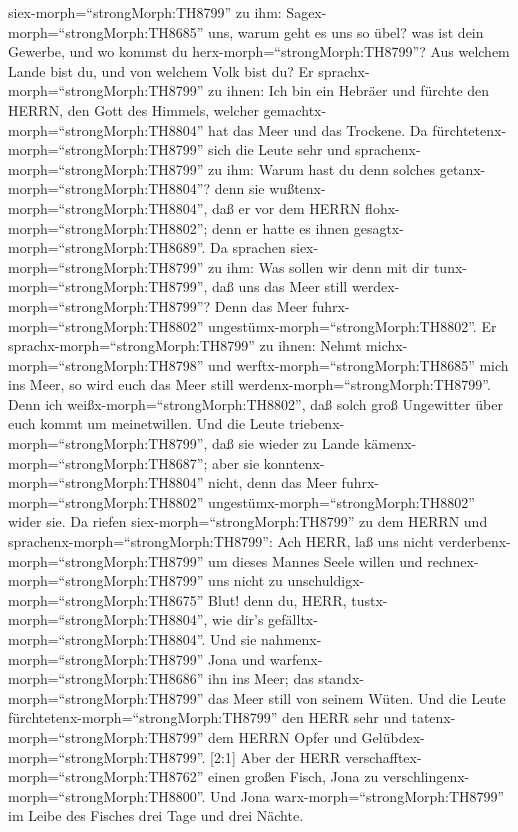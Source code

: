 siex-morph=``strongMorph:TH8799'' zu ihm:
Sagex-morph=``strongMorph:TH8685'' uns, warum geht es uns so übel? was
ist dein Gewerbe, und wo kommst du herx-morph=``strongMorph:TH8799''?
Aus welchem Lande bist du, und von welchem Volk bist du?  Er
sprachx-morph=``strongMorph:TH8799'' zu ihnen: Ich bin ein Hebräer und
fürchte den HERRN, den Gott des Himmels, welcher
gemachtx-morph=``strongMorph:TH8804'' hat das Meer und das Trockene.
 Da fürchtetenx-morph=``strongMorph:TH8799'' sich die Leute
sehr und sprachenx-morph=``strongMorph:TH8799'' zu ihm: Warum hast du
denn solches getanx-morph=``strongMorph:TH8804''? denn sie
wußtenx-morph=``strongMorph:TH8804'', daß er vor dem HERRN
flohx-morph=``strongMorph:TH8802''; denn er hatte es ihnen
gesagtx-morph=``strongMorph:TH8689''.  Da sprachen
siex-morph=``strongMorph:TH8799'' zu ihm: Was sollen wir denn mit dir
tunx-morph=``strongMorph:TH8799'', daß uns das Meer still
werdex-morph=``strongMorph:TH8799''? Denn das Meer
fuhrx-morph=``strongMorph:TH8802''
ungestümx-morph=``strongMorph:TH8802''.  Er
sprachx-morph=``strongMorph:TH8799'' zu ihnen: Nehmt
michx-morph=``strongMorph:TH8798'' und
werftx-morph=``strongMorph:TH8685'' mich ins Meer, so wird euch das Meer
still werdenx-morph=``strongMorph:TH8799''. Denn ich
weißx-morph=``strongMorph:TH8802'', daß solch groß Ungewitter über euch
kommt um meinetwillen.  Und die Leute
triebenx-morph=``strongMorph:TH8799'', daß sie wieder zu Lande
kämenx-morph=``strongMorph:TH8687''; aber sie
konntenx-morph=``strongMorph:TH8804'' nicht, denn das Meer
fuhrx-morph=``strongMorph:TH8802''
ungestümx-morph=``strongMorph:TH8802'' wider sie.  Da
riefen siex-morph=``strongMorph:TH8799'' zu dem HERRN und
sprachenx-morph=``strongMorph:TH8799'': Ach HERR, laß uns nicht
verderbenx-morph=``strongMorph:TH8799'' um dieses Mannes Seele willen
und rechnex-morph=``strongMorph:TH8799'' uns nicht zu
unschuldigx-morph=``strongMorph:TH8675'' Blut! denn du, HERR,
tustx-morph=``strongMorph:TH8804'', wie dir's
gefälltx-morph=``strongMorph:TH8804''.  Und sie
nahmenx-morph=``strongMorph:TH8799'' Jona und
warfenx-morph=``strongMorph:TH8686'' ihn ins Meer; das
standx-morph=``strongMorph:TH8799'' das Meer still von seinem Wüten.
 Und die Leute fürchtetenx-morph=``strongMorph:TH8799'' den
HERR sehr und tatenx-morph=``strongMorph:TH8799'' dem HERRN Opfer und
Gelübdex-morph=``strongMorph:TH8799''.  {[}2:1{]} Aber der
HERR verschafftex-morph=``strongMorph:TH8762'' einen großen Fisch, Jona
zu verschlingenx-morph=``strongMorph:TH8800''. Und Jona
warx-morph=``strongMorph:TH8799'' im Leibe des Fisches drei Tage und
drei Nächte.

